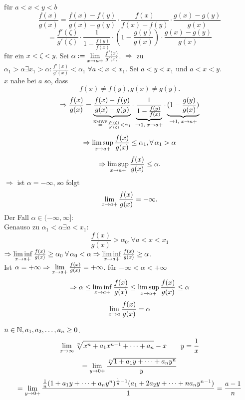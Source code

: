 \documentclass[../ana2.tex]{subfiles}
\begin{document}
\begin{bew}
    für \( a < x < y < b \)
    \[ \frac{f(x)}{g(x)} = \frac{f(x) - f(y)}{g(x) -g(y)} 
    \cdot \frac{f(x)}{f(x)-f(y)} \cdot \frac{g(x)-g(y)}{g(x)} \]
    \[ = \frac{f'(\zeta)}{g'(\zeta)} \cdot 
    \frac{1}{1-\frac{f(y)}{f(x)}} \cdot 
    \left(1 - \frac{g(y)}{g(x)} \right) \cdot %
    \frac{g(x)-g(y)}{g(x)} \]
    für ein \( x < \zeta < y \).
    Sei \( \alpha := \lim\limits_{x\rightarrow{}a+} \frac{f'(x)}{g'(x)} \).
    \( \Rightarrow \) zu \( \alpha_1 > \alpha \exists 
    x_1 > \alpha : \frac{f'(x)}{g'(x)} < \alpha_1 
    \;\forall a < x < x_1 \).
    Sei \( a < y < x_1 \) und \(a < x < y \). \\
    \(x\) nahe bei \(a\) so, dass
    \[ f(x) \neq f(y), g(x) \neq g(y). \]
    \[ \Rightarrow \frac{f(x)}{g(x)} 
    = \underbrace{\frac{f(x)-f(y)}{g(x)-g(y)}}_{
        \overset{\text{ZMWS}}{=} \frac{f'(\zeta)}{g'(\zeta)} < \alpha_1
    }
    \cdot \underbrace{\frac{1}{1-\frac{f(y)}{f(x)}} }_{
        \rightarrow 1, \;x\rightarrow a+}
    \cdot \underbrace{(1- \frac{g(y)}{g(x)})}_{
        \rightarrow 1, \;x\rightarrow a+} \]
    \[ \Rightarrow \limessupx{x}{a+} \frac{f(x)}{g(x)} 
    \leq \alpha_1, \forall \alpha_1 > \alpha \]
    \[ \Rightarrow \limsup\limits_{x\rightarrow{}a+} \frac{f(x)}{g(x)} \leq \alpha. \]
    \( \Rightarrow \) ist \( \alpha = -\infty \), so folgt 
    \[ \lim\limits_{x\rightarrow{}a+} \frac{f(x)}{g(x)} = -\infty. \]
    Der Fall \( \alpha \in (-\infty, \infty]: \) \\
    Genauso zu \( \alpha_1 < \alpha \exists a < x_1: \)
    \[ \frac{f(x)}{g(x)} > \alpha_0, \forall a < x < x_1 \]
    \( \Rightarrow \limesinfx{x}{a+} \frac{f(x)}{g(x)} 
    \geq \alpha_0\;\forall \alpha_0 < \alpha \\
    \Rightarrow \limesinfx{x}{a+} \frac{f(x)}{g(x)} \geq \alpha \).\\
    Ist \( \alpha = +\infty \Rightarrow \lim\limits_{x\rightarrow{}a+} 
    \frac{f(x)}{g(x)} = +\infty \).    
    für \( -\infty < \alpha < +\infty \)
    \[ \Rightarrow \alpha \leq \liminf\limits_{x\rightarrow{}a+} \frac{f(x)}{g(x)} 
    \leq \limsup\limits_{x\rightarrow{}a+} \frac{f(x)}{g(x)} \leq \alpha \]
    \[ \lim\limits_{x\rightarrow{}a} \frac{f(x)}{g(x)} = \alpha \]
\end{bew}
\begin{bsp}%
    \( n\in\mathbb{N}, a_1, a_2, \ldots, a_n \geq 0 \).
    \[ \lim\limits_{x\rightarrow\infty} \sqrt[n]{x^n + a_1 x^{n-1} + \cdots + a_n} - x 
    \qquad y = \frac{1}{x} \]
    \[ = \lim\limits_{y\rightarrow{}0+} \frac{ \sqrt[n]{1 + a_1 y + \cdots + a_n y^n} }{y} \]
    \[ = \lim\limits_{y\rightarrow{}0+} \frac{ \frac{1}{n} 
    (1 + a_1 y + \cdots + a_n y^n)^{\frac{1}{n} - 1} 
    (a_1 + 2a_2 y + \cdots + n a_n y^{n-1}) }{ 1 } = \frac{a-1}{n} \]
\end{bsp}
\end{document}
